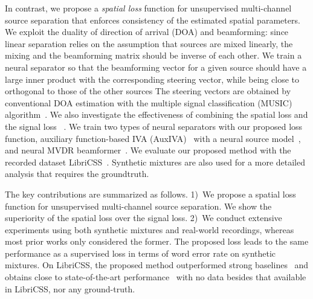 \documentclass[a4paper]{article}
\begin{document}
In contrast, we propose a \textit{spatial loss} function for unsupervised multi-channel source separation that enforces consistency of the estimated spatial parameters.
We exploit the duality of direction of arrival (DOA) and beamforming: since linear separation relies on the assumption that sources are mixed linearly, the mixing and the beamforming matrix should be inverse of each other.
We train a neural separator so that the beamforming vector for a given source should have a large inner product with the corresponding steering vector, while being close to orthogonal to those of the other sources
The steering vectors are obtained by conventional DOA estimation with the multiple signal classification (MUSIC) algorithm~\cite{music}.
We also investigate the effectiveness of combining the spatial loss and the signal loss~\cite{Togami-unsup-kld, cisdr} .
We train two types of neural separators with our proposed loss function, auxiliary function-based IVA (AuxIVA)~\cite{auxiva_ip} with a neural source model~\cite{auxiva-iss-dnn}, and neural MVDR beamformer~\cite{cisdr}.
We evaluate our proposed method with the recorded dataset LibriCSS~\cite{libricss}.
Synthetic mixtures are also used for a more detailed analysis that requires the groundtruth.


The key contributions are summarized as follows.
1)~We propose a spatial loss function for unsupervised multi-channel source separation.
We show the superiority of the spatial loss over the signal loss.
2)~We conduct extensive experiments using both synthetic mixtures and real-world recordings, whereas most prior works only considered the former.
The proposed loss leads to the same performance as a supervised loss in terms of word error rate on synthetic mixtures.
On LibriCSS, the proposed method outperformed strong baselines~\cite{libricss_conformer} and obtains close to state-of-the-art performance~\cite{libricss_sota} with no data besides that available in LibriCSS, nor any ground-truth.
\end{document}
